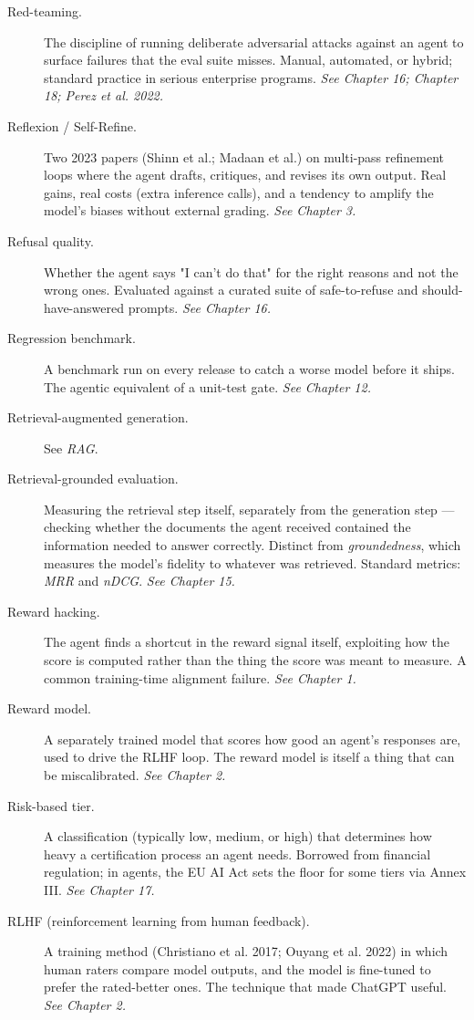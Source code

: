 \begin{description}
  \item[Red-teaming.] The discipline of running deliberate adversarial attacks against an agent to surface failures that the eval suite misses. Manual, automated, or hybrid; standard practice in serious enterprise programs. \textit{See Chapter 16; Chapter 18; Perez et al. 2022.}
  \item[Reflexion / Self-Refine.] Two 2023 papers (Shinn et al.; Madaan et al.) on multi-pass refinement loops where the agent drafts, critiques, and revises its own output. Real gains, real costs (extra inference calls), and a tendency to amplify the model's biases without external grading. \textit{See Chapter 3.}
  \item[Refusal quality.] Whether the agent says "I can't do that" for the right reasons and not the wrong ones. Evaluated against a curated suite of safe-to-refuse and should-have-answered prompts. \textit{See Chapter 16.}
  \item[Regression benchmark.] A benchmark run on every release to catch a worse model before it ships. The agentic equivalent of a unit-test gate. \textit{See Chapter 12.}
  \item[Retrieval-augmented generation.] See \textit{RAG}.
  \item[Retrieval-grounded evaluation.] Measuring the retrieval step itself, separately from the generation step — checking whether the documents the agent received contained the information needed to answer correctly. Distinct from \textit{groundedness}, which measures the model's fidelity to whatever was retrieved. Standard metrics: \textit{MRR} and \textit{nDCG}. \textit{See Chapter 15.}
  \item[Reward hacking.] The agent finds a shortcut in the reward signal itself, exploiting how the score is computed rather than the thing the score was meant to measure. A common training-time alignment failure. \textit{See Chapter 1.}
  \item[Reward model.] A separately trained model that scores how good an agent's responses are, used to drive the RLHF loop. The reward model is itself a thing that can be miscalibrated. \textit{See Chapter 2.}
  \item[Risk-based tier.] A classification (typically low, medium, or high) that determines how heavy a certification process an agent needs. Borrowed from financial regulation; in agents, the EU AI Act sets the floor for some tiers via Annex III. \textit{See Chapter 17.}
  \item[RLHF (reinforcement learning from human feedback).] A training method (Christiano et al. 2017; Ouyang et al. 2022) in which human raters compare model outputs, and the model is fine-tuned to prefer the rated-better ones. The technique that made ChatGPT useful. \textit{See Chapter 2.}

\end{description}
